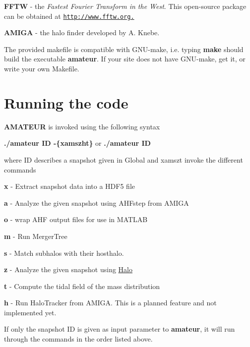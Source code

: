 \begin{DoxyItemize}
\item {\bfseries FFTW} -\/ the {\itshape Fastest Fourier Transform in the West\/}. This open-\/source package can be obtained at \href{http://www.fftw.org.}{\tt http://www.fftw.org.}
\end{DoxyItemize}


\begin{DoxyItemize}
\item {\bfseries AMIGA} -\/ the halo finder developed by A. Knebe.
\end{DoxyItemize}

The provided makefile is compatible with GNU-\/make, i.e. typing {\bfseries make} should build the executable {\bfseries amateur}. If your site does not have GNU-\/make, get it, or write your own Makefile.\hypertarget{index_howtorun}{}\section{Running the code}\label{index_howtorun}
{\bfseries AMATEUR} is invoked using the following syntax

{\bfseries  ./amateur ID -\/\{xamszht\}} or {\bfseries  ./amateur ID }

where ID describes a snapshot given in Global and xamszt invoke the different commands


\begin{DoxyItemize}
\item {\bfseries x} -\/ Extract snapshot data into a HDF5 file
\item {\bfseries a} -\/ Analyze the given snapshot using AHFstep from AMIGA
\item {\bfseries o} -\/ wrap AHF output files for use in MATLAB
\item {\bfseries m} -\/ Run MergerTree
\item {\bfseries s} -\/ Match subhalos with their hosthalo.
\item {\bfseries z} -\/ Analyze the given snapshot using \hyperlink{classHalo}{Halo}
\item {\bfseries t} -\/ Compute the tidal field of the mass distribution
\item {\bfseries h} -\/ Run HaloTracker from AMIGA. This is a planned feature and not implemented yet.
\end{DoxyItemize}

If only the snapshot ID is given as input parameter to {\bfseries amateur}, it will run through the commands in the order listed above. 